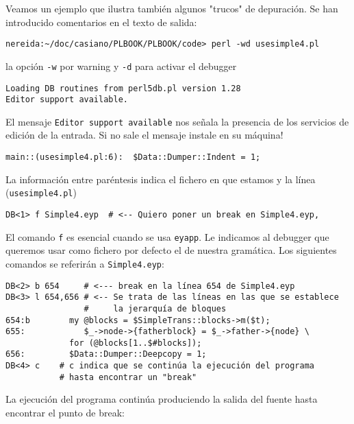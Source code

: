 Veamos un ejemplo que ilustra también algunos "trucos" de depuración.
Se han introducido comentarios en el texto de salida:
\begin{verbatim}
nereida:~/doc/casiano/PLBOOK/PLBOOK/code> perl -wd usesimple4.pl 
\end{verbatim}
la opción \verb|-w| por warning y \verb|-d| para activar el debugger
\begin{verbatim}
Loading DB routines from perl5db.pl version 1.28
Editor support available.  
\end{verbatim}
El mensaje \verb|Editor support available| nos señala 
la presencia de los servicios de edición de la entrada.
Si no sale el mensaje instale  en su máquina!
\begin{verbatim}
main::(usesimple4.pl:6):  $Data::Dumper::Indent = 1; 
\end{verbatim}
La información entre paréntesis indica 
el fichero en que estamos y la línea (\verb|usesimple4.pl|)
\begin{verbatim}
DB<1> f Simple4.eyp  # <-- Quiero poner un break en Simple4.eyp, 
\end{verbatim}
El comando \verb|f| es esencial cuando se usa \verb|eyapp|. 
Le indicamos al debugger que queremos usar como fichero
por defecto el de nuestra gramática. Los siguientes
comandos se referirán a \verb|Simple4.eyp|:
\begin{verbatim}
DB<2> b 654     # <--- break en la línea 654 de Simple4.eyp
DB<3> l 654,656 # <-- Se trata de las líneas en las que se establece 
                #     la jerarquía de bloques
654:b        my @blocks = $SimpleTrans::blocks->m($t);
655:            $_->node->{fatherblock} = $_->father->{node} \
             for (@blocks[1..$#blocks]);
656:         $Data::Dumper::Deepcopy = 1;
DB<4> c    # c indica que se continúa la ejecución del programa 
           # hasta encontrar un "break"
\end{verbatim}
La ejecución del programa continúa produciendo la salida 
del fuente hasta encontrar el punto de break:
